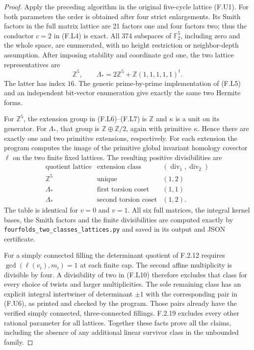 \begin{proof}
Apply the preceding algorithm in the original five-cycle
lattice (F.U1).  For both parameters the order is obtained
after four strict enlargements.  Its Smith factors in the
full matrix lattice are 21 factors one and four factors two;
thus the conductor $c=2$ in (F.L4) is exact.
All 374 subspaces of $\mathbb F_2^5$, including zero and
the whole space, are enumerated, with no height restriction
or neighbor-depth assumption.
After imposing stability and coordinate gcd one, the two
lattice representatives are
\[
 \mathbb Z^5,\qquad
 \Lambda_* =2\mathbb Z^5+\mathbb Z(1,1,1,1,1)^t.
 \tag{F.L9}
\]
The latter has index $16$.
The generic prime-by-prime implementation of (F.L5) and
an independent bit-vector enumeration give exactly the
same two Hermite forms.

For $\mathbb Z^5$, the extension group in (F.L6)--(F.L7)
is $\mathbb Z$ and $\kappa$ is a unit on its generator.
For $\Lambda_*$, that group is
$\mathbb Z\oplus\mathbb Z/2$, again with primitive
$\kappa$.  Hence there are exactly one and two primitive
extensions, respectively.
For each extension the program computes the image of the
primitive global invariant homology covector $\ell$ on
the two finite fixed lattices.  The resulting positive
divisibilities are
\[
\begin{array}{c|c|c}
 \text{quotient lattice}&\text{extension class}&
       (\operatorname{div}_1,\operatorname{div}_2)\\\hline
 \mathbb Z^5&\text{unique}&(1,2)\\
 \Lambda_*&\text{first torsion coset}&(1,1)\\
 \Lambda_*&\text{second torsion coset}&(1,2).
\end{array}
 \tag{F.L10}
\]
The table is identical for $v=0$ and $v=1$.
All six full matrices, the integral kernel bases, the
Smith factors and the finite divisibilities are computed
exactly by \texttt{fourfolds\_two\_classes\_lattices.py}
and saved in its output and JSON certificate.

For a simply connected filling the determinant quotient
of F.2.12 requires $\gcd(\ell(v_i),m_i)=1$ at each
finite cap.  The second affine multiplicity is divisible
by four.  A divisibility of two in (F.L10) therefore
excludes that class for every choice of twists and larger
multiplicities.
The sole remaining class has an explicit integral
intertwiner of determinant $\pm1$ with the corresponding
pair in (F.U6), as printed and checked by the program.
Those pairs already have the verified simply connected,
three-connected fillings.  F.2.19 excludes every other
rational parameter for all lattices.
Together these facts prove all the claims, including the
absence of any additional linear survivor class in the
unbounded family.
\end{proof}
